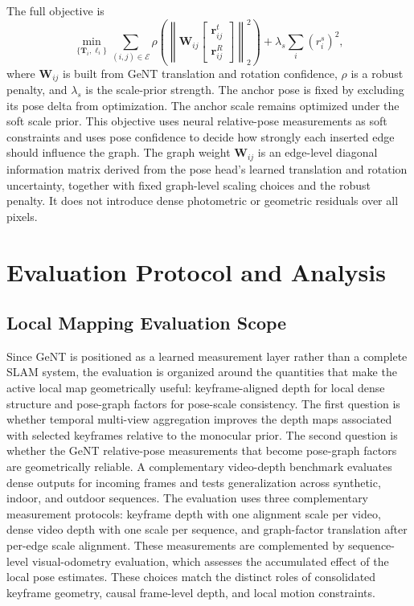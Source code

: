 The full objective is
\begin{equation}
    \min_{\{\bm{T}_i,\ell_i\}}
    \sum_{(i,j)\in\mathcal{E}}
    \rho\!\left(
        \left\|
        \bm{W}_{ij}
        \begin{bmatrix}
        \bm{r}^{t}_{ij}\\
        \bm{r}^{R}_{ij}
        \end{bmatrix}
        \right\|_2^2
    \right)
    +
    \lambda_s
    \sum_i
    \left(r_i^s\right)^2,
    \label{eq:geont_pgo_objective}
\end{equation}
where $\bm{W}_{ij}$ is built from GeNT translation and rotation confidence, $\rho$ is a robust penalty, and $\lambda_s$ is the scale-prior strength.
The anchor pose is fixed by excluding its pose delta from optimization.
The anchor scale remains optimized under the soft scale prior.
This objective uses neural relative-pose measurements as soft constraints and uses pose confidence to decide how strongly each inserted edge should influence the graph.
The graph weight $\bm{W}_{ij}$ is an edge-level diagonal information matrix derived from the pose head's learned translation and rotation uncertainty, together with fixed graph-level scaling choices and the robust penalty.
It does not introduce dense photometric or geometric residuals over all pixels.

\section{Evaluation Protocol and Analysis}
\label{sec:geont_eval_protocol}

\subsection{Local Mapping Evaluation Scope}
Since GeNT is positioned as a learned measurement layer rather than a complete SLAM system, the evaluation is organized around the quantities that make the active local map geometrically useful: keyframe-aligned depth for local dense structure and pose-graph factors for pose-scale consistency.
The first question is whether temporal multi-view aggregation improves the depth maps associated with selected keyframes relative to the monocular prior.
The second question is whether the GeNT relative-pose measurements that become pose-graph factors are geometrically reliable.
A complementary video-depth benchmark evaluates dense outputs for incoming frames and tests generalization across synthetic, indoor, and outdoor sequences.
The evaluation uses three complementary measurement protocols: keyframe depth with one alignment scale per video, dense video depth with one scale per sequence, and graph-factor translation after per-edge scale alignment.
These measurements are complemented by sequence-level visual-odometry evaluation, which assesses the accumulated effect of the local pose estimates.
These choices match the distinct roles of consolidated keyframe geometry, causal frame-level depth, and local motion constraints.

